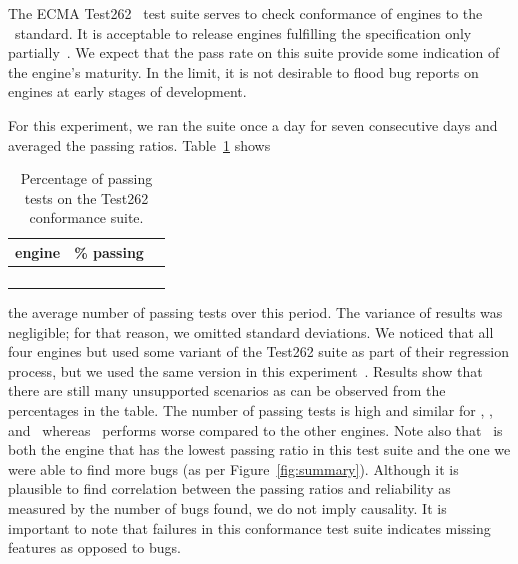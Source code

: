 \documentclass[sigconf,review, anonymous]{acmart}
\begin{document}
The ECMA Test262~\cite{ecma262-conformance-suite} test suite serves to
check conformance of engines to the \js\ standard. It is
acceptable to release engines fulfilling the specification only
partially~\cite{kangax}. We expect that the pass rate on this suite
provide some indication of the engine's maturity. In the limit, it is
not desirable to flood bug reports on engines at early stages of
development. 

For this experiment, we ran the suite once a day for seven consecutive
days and averaged the passing ratios. Table~\ref{tab:test262} shows
\begin{table}
  \vspace{-2ex}      
  \centering
  \caption{\label{tab:test262}Percentage of passing tests on
    the Test262 conformance suite.}
  \vspace{-2ex}        
  \small
  \begin{tabular}{crr}
    \toprule
    engine & \% passing \\
    \midrule
    \jsc{} & \percentSuiteTestJSC{}\\
    \veight{} & \percentSuiteTestVeight{} \\
    \chakra{} & \percentSuiteTestChakra{} \\    
    \smonkey{} & \percentSuiteTestSM{} \\
    \bottomrule
  \end{tabular}
  \normalsize
  \vspace{-4ex}
\end{table}
the average number of passing tests over this period. The variance of
results was negligible; for that reason, we omitted standard
deviations. We noticed that all four engines but \chakra{} used some
variant of the Test262 suite as part of their regression process, but
we used the same version in this
experiment~\cite{ecma262-conformance-suite}. Results show that there
are still many unsupported scenarios as can be observed from the
percentages in the table. The number of passing tests is high and
similar for \jsc{}, \veight{}, and \smonkey\ whereas \chakra\ performs
worse compared to the other engines. Note also that \chakra\ is both
the engine that has the lowest passing ratio in this test suite and
the one we were able to find more bugs (as per
Figure~\ref{fig:summary}). Although it is plausible to find
correlation between the passing ratios and reliability as measured by
the number of bugs found, we do not imply causality. It is important
to note that failures in this conformance test suite indicates missing
features as opposed to bugs.
\end{document}
